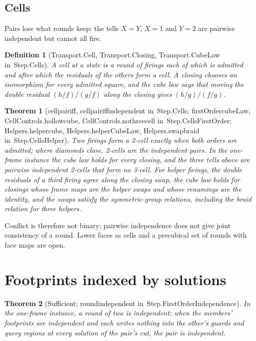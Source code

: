 \documentclass[11pt]{article}
\newtheorem{definition}{Definition}
\newtheorem{theorem}{Theorem}
\theoremstyle{remark}
\newcommand{\lean}[1]{{\ttfamily\def\_{\textunderscore\allowbreak}#1}}
\newcommand{\inmod}[1]{in~{\ttfamily\def\_{\textunderscore\allowbreak}#1}}
\begin{document}
\subsection{Cells}

Pairs lose what rounds keep: the tells $X=Y$, $X=1$ and $Y=2$ are pairwise independent but cannot all
fire.

\begin{definition}[\lean{Transport.Cell}, \lean{Transport.Closing}, \lean{Transport.CubeLaw} \inmod{Step.Cells}]
A \emph{cell} at a state is a round of firings each of which is admitted and after which the residuals
of the others form a cell. A \emph{closing} chooses an isomorphism for every admitted square, and the
\emph{cube law} says that moving the double residual $(h/f)/(g/f)$ along the closing gives $(h/g)/(f/g)$.
\end{definition}

\begin{theorem}[\lean{cell\_pair\_iff}, \lean{cell\_pair\_iff\_independent} \inmod{Step.Cells}; \lean{firstOrder\_cubeLaw}, \lean{CellControls.hollow\_cube}, \lean{CellControls.no\_three\_cell} \inmod{Step.CellsFirstOrder}; \lean{Helpers.helper\_cube}, \lean{Helpers.helperCubeLaw}, \lean{Helpers.swap\_braid} \inmod{Step.CellsHelper}]
Two firings form a 2-cell exactly when both orders are admitted; where diamonds close, 2-cells are the
independent pairs. In the one-frame instance the cube law holds for every closing, and the three tells
above are pairwise independent 2-cells that form no 3-cell. For helper firings, the double residuals of a
third firing agree along the closing swap, the cube law
holds for closings whose frame maps are the helper swaps and whose renamings are the identity, and the
swaps satisfy the symmetric-group relations, including the braid relation for three helpers.
\end{theorem}

Conflict is therefore not binary: pairwise independence does not give joint consistency of a round.
Lower faces as cells and a precubical set of rounds with face maps are open.

\section{Footprints indexed by solutions}

\begin{theorem}[Sufficient; \lean{round\_independent} \inmod{Step.FirstOrderIndependence}]
In the one-frame instance, a round of two is independent: when the members' footprints are independent
and each writes nothing into the other's guards and query regions at every solution of the pair's cut,
the pair is independent.
\end{theorem}
\end{document}
